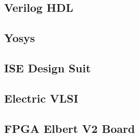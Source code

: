 \subsection{Verilog HDL}

\subsection{Yosys}

\subsection{ISE Design Suit}

\subsection{Electric VLSI}

\subsection{FPGA Elbert V2 Board}
